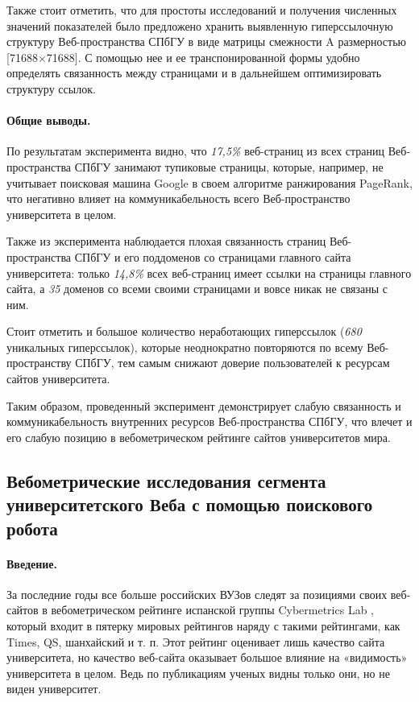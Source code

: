 Также стоит отметить, что для простоты исследований и получения численных значений показателей было предложено хранить выявленную гиперссылочную структуру Веб-пространства СПбГУ в виде матрицы смежности A размерностью [71688\(\times\)71688]. С помощью нее и ее транспонированной формы удобно определять связанность между страницами и в дальнейшем оптимизировать структуру ссылок. 

\paragraph{Общие выводы.} По результатам эксперимента видно, что \textit{17,5\%} веб-страниц из всех страниц Веб-пространства СПбГУ занимают тупиковые страницы, которые, например, не учитывает поисковая машина Google в своем алгоритме ранжирования PageRank, что негативно влияет на коммуникабельность всего Веб-пространство университета в целом. 

Также из эксперимента наблюдается плохая связанность страниц Веб-пространства СПбГУ и его поддоменов со страницами главного сайта университета: только \textit{14,8\%} всех веб-страниц имеет ссылки на страницы главного сайта, а \textit{35} доменов со всеми своими страницами и вовсе никак не связаны с ним. 

Стоит отметить и большое количество неработающих гиперссылок (\textit{680} уникальных гиперссылок), которые неоднократно повторяются по всему Веб-пространству СПбГУ, тем самым снижают доверие пользователей к ресурсам сайтов университета. 

Таким образом, проведенный эксперимент демонстрирует слабую связанность и коммуникабельность внутренних ресурсов Веб-пространства СПбГУ, что влечет и его слабую позицию в вебометрическом рейтинге сайтов университетов мира.

\subsection{Вебометрические исследования сегмента университетского Веба с помощью поискового робота}\label{subsec:ch1/sec3/sub3}

\paragraph{Введение.} За последние годы все больше российских ВУЗов следят за позициями своих веб-сайтов в вебометрическом рейтинге испанской группы Cybermetrics Lab \cite{RankingWeb}, который входит в пятерку мировых рейтингов наряду с такими рейтингами, как Times, QS, шанхайский и т. п. Этот рейтинг оценивает лишь качество сайта университета, но качество веб-сайта оказывает большое влияние на «видимость» университета в целом. Ведь по публикациям ученых видны только они, но не виден университет.


